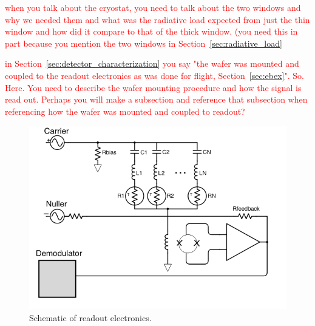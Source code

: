 \textcolor{red}{when you talk about the cryostat, you need to talk about the two windows and why we needed them and what was the radiative load expected from just the thin window and how did it compare to that of the thick window. (you need this in part because you mention the two windows in Section~\ref{sec:radiative_load}}

\textcolor{red}{in Section~\ref{sec:detector_characterization} you say "the wafer was mounted and coupled to the readout electronics as was done for flight, Section~\ref{sec:ebex}". 
So. 
Here. You need to describe the wafer mounting procedure and how the signal is read out. 
Perhaps you will make a subsection and reference that subsection when referencing how the wafer was mounted and coupled to readout?}

\begin{figure}[htbp]
\begin{center}
\includegraphics[width=0.6\columnwidth]{figures/dfmux_schematic.png}
\caption{Schematic of readout electronics. 
\label{fig:dfmux} }
\end{center}
\end{figure}
 








